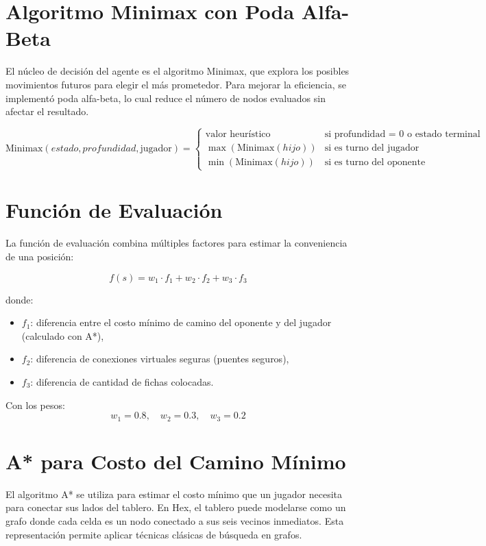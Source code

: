 \documentclass[12pt]{article}
\begin{document}
\section{Algoritmo Minimax con Poda Alfa-Beta}
El núcleo de decisión del agente es el algoritmo Minimax, que explora los posibles movimientos futuros para elegir el más prometedor. Para mejorar la eficiencia, se implementó poda alfa-beta, lo cual reduce el número de nodos evaluados sin afectar el resultado.

\[
\text{Minimax}(estado, profundidad, \text{jugador}) = 
\begin{cases}
\text{valor heurístico} & \text{si profundidad = 0 o estado terminal} \\
\max(\text{Minimax}(hijo)) & \text{si es turno del jugador} \\
\min(\text{Minimax}(hijo)) & \text{si es turno del oponente}
\end{cases}
\]

\section{Función de Evaluación}
La función de evaluación combina múltiples factores para estimar la conveniencia de una posición:

\[
f(s) = w_1 \cdot f_1 + w_2 \cdot f_2 + w_3 \cdot f_3
\]

donde:
\begin{itemize}
  \item \( f_1 \): diferencia entre el costo mínimo de camino del oponente y del jugador (calculado con A*),
  \item \( f_2 \): diferencia de conexiones virtuales seguras (puentes seguros),
  \item \( f_3 \): diferencia de cantidad de fichas colocadas.
\end{itemize}

Con los pesos:
\[
w_1 = 0.8,\quad w_2 = 0.3,\quad w_3 = 0.2
\]

\section{A* para Costo del Camino Mínimo}

El algoritmo A* se utiliza para estimar el costo mínimo que un jugador necesita para conectar sus lados del tablero. En Hex, el tablero puede modelarse como un grafo donde cada celda es un nodo conectado a sus seis vecinos inmediatos. Esta representación permite aplicar técnicas clásicas de búsqueda en grafos.
\end{document}
